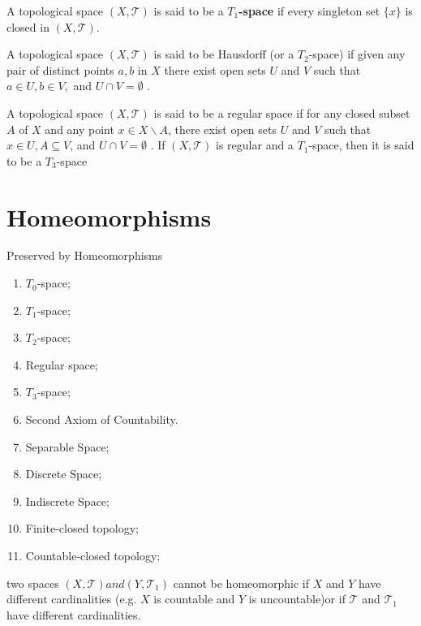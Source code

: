 \documentclass[10pt,a4paper]{report}
\newcommand{\TT}{\mathcal{T}}
\begin{document}
\begin{definition}[$T_1$ Spaces]A topological space $(X, \TT)$ is said to be a \textbf{$T_1$-space} if every singleton set $\{x\}$ is closed in $(X,\TT)$.
\end{definition}

\begin{definition}A topological space $(X,
\TT )$ is said to be Hausdorff (or a $T_2$-space) if given any
pair of distinct points $a, b$ in $X$ there exist open sets $U$ and $V$ such that $a \in U, b \in V,$ and $U \cap V = \emptyset$ .
\end{definition}

\begin{definition}A topological space $(X,
\TT )$ is said to be a regular space if for any closed subset
$A$ of $X$ and any point $x \in X \backslash A$, there exist open sets $U$ and $V$ such that $x \in U, A \subseteq V$, and $U \cap V = \emptyset$ . If $(X, \TT )$ is regular and a $T_1$-space, then it is
said to be a $T_3$-space
\end{definition}

\section{Homeomorphisms}

\begin{remark}Preserved by Homeomorphisms
\begin{enumerate}
	\item $T_0$-space;
	\item $T_1$-space;
	\item $T_2$-space;
	\item Regular space;
	\item $T_3$-space;
	\item Second Axiom of Countability.
	\item Separable Space;
	\item Discrete Space;
	\item Indiscrete Space;
	\item Finite-closed topology;
	\item Countable-closed topology;
\end{enumerate}
\end{remark}

\begin{remark}two spaces $(X,\TT ) and (Y, \TT_1 )$ cannot be homeomorphic if $X$ and $Y$ have different cardinalities (e.g. $X$ is countable and $Y$ is 
uncountable)or if $\TT$ and $\TT_1$ have different cardinalities.
\end{remark}
\end{document}
